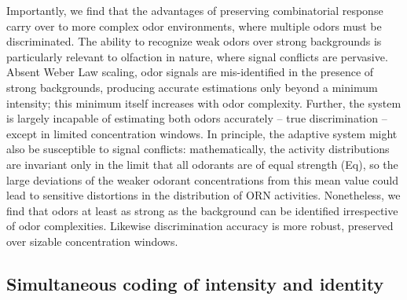Importantly, we find that the advantages of preserving combinatorial response carry over to more complex odor environments, where multiple odors must be discriminated. The ability to recognize weak odors over strong backgrounds is particularly relevant to olfaction in nature, where signal conflicts are pervasive. Absent Weber Law scaling, odor signals are mis-identified in the presence of strong backgrounds, producing accurate estimations only beyond a minimum intensity; this minimum itself increases with odor complexity. Further, the system is largely incapable of estimating both odors accurately -- true discrimination -- except in limited concentration windows. In principle, the adaptive system might also be susceptible to signal conflicts: mathematically, the activity distributions are invariant only in the limit that all odorants are of equal strength (Eq), so the large deviations of the weaker odorant concentrations from this mean value could lead to sensitive distortions in the distribution of ORN activities. Nonetheless, we find that odors at least as strong as the background can be identified irrespective of odor complexities. Likewise discrimination accuracy is more robust, preserved over sizable concentration windows. 




\subsection{Simultaneous coding of intensity and identity}

